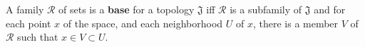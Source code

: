 A family $\mathscr{R}$ of sets is a \textbf{base} for a topology $\mathfrak{J}$ iff $\mathscr{R}$ is a subfamily of $\mathfrak{J}$ and for each point $x$ of the space, and each neighborhood $U$ of $x$, there is a member $V$ of $\mathscr{R}$ such that $x \in V \subset U$.
